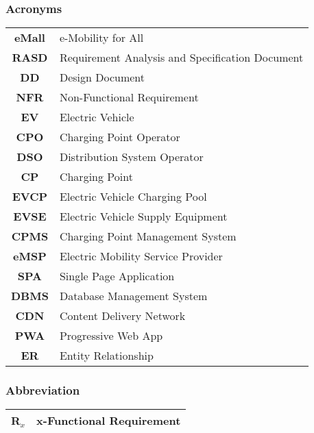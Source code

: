 \subsubsection{Acronyms}
\begin{table}[H]
    \begin{tabularx}{\textwidth}{cX}
        \toprule
        \textbf{eMall} & e-Mobility for All                              \\
        \textbf{RASD}  & Requirement Analysis and Specification Document \\
        \textbf{DD}    & Design Document                                 \\
        \textbf{NFR}   & Non-Functional Requirement                      \\
        \textbf{EV}    & Electric Vehicle                                \\
        \textbf{CPO}   & Charging Point Operator                         \\
        \textbf{DSO}   & Distribution System Operator                    \\
        \textbf{CP}    & Charging Point                                  \\
        \textbf{EVCP}  & Electric Vehicle Charging Pool                  \\
        \textbf{EVSE}  & Electric Vehicle Supply Equipment               \\
        \textbf{CPMS}  & Charging Point Management System                \\
        \textbf{eMSP}  & Electric Mobility Service Provider              \\
        \textbf{SPA}   & Single Page Application                         \\
        \textbf{DBMS}  & Database Management System                      \\
        \textbf{CDN}   & Content Delivery Network                        \\
        \textbf{PWA}   & Progressive Web App                             \\
        \textbf{ER}    & Entity Relationship                             \\
        \bottomrule
    \end{tabularx}
\end{table}
\vspace*{1cm}
\subsubsection{Abbreviation}
\begin{table}[H]
    \begin{tabularx}{\textwidth}{cX}
        \toprule
        \textbf{R$_x$} & x-Functional Requirement \\
        \bottomrule
    \end{tabularx}
\end{table}
